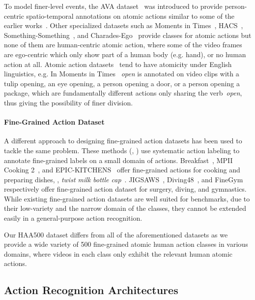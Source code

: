 \documentclass[10pt,twocolumn,letterpaper]{article}
\begin{document}
To model finer-level events, the AVA dataset~\cite{AVA} was introduced to provide person-centric spatio-temporal annotations on atomic actions similar to some of the earlier works~\cite{DBLP:conf/iccv/BlankGSIB05,DBLP:conf/icpr/SchuldtLC04}.
Other specialized datasets such as Moments in Times~\cite{momentsintime}, HACS~\cite{zhao2019hacs}, Something-Something~\cite{goyal2017something}, and Charades-Ego~\cite{sigurdsson2016hollywood} provide classes for atomic actions but none of them are human-centric atomic action, where some of the video frames are ego-centric which only show part of a human body (e.g. hand), or no human action at all. Atomic action datasets~\cite{AVA,momentsintime} tend to have atomicity under English linguistics, e.g. In Moments in Times~\cite{momentsintime} \textit{open} is annotated on video clips with a tulip opening, an eye opening, a person opening a door, or a person opening a package, which are fundamentally different actions only sharing the verb~\textit{open}, thus giving the possibility of finer division.


\paragraph{Fine-Grained Action Dataset} A different approach to designing fine-grained action datasets has been used to tackle the same problem. These methods (\eg, \cite{epickitchens,jigsaws,breakfast,diving48,MPIICooking2,finegym}) use systematic action labeling to annotate fine-grained labels on a small domain of actions. Breakfast~\cite{breakfast}, MPII Cooking 2~\cite{MPIICooking2}, and EPIC-KITCHENS~\cite{epickitchens} offer fine-grained actions for cooking and preparing dishes, \eg, \textit{twist milk bottle cap}~\cite{breakfast}.
JIGSAWS~\cite{jigsaws}, Diving48~\cite{diving48}, and FineGym~\cite{finegym} respectively offer fine-grained action dataset for surgery, diving, and gymnastics. While existing fine-grained action datasets are well suited for benchmarks, due to their low-variety and the narrow domain of the classes, they cannot be extended easily in a general-purpose action recognition.

Our HAA500 dataset differs from all of the aforementioned datasets as we provide a wide variety of 500 fine-grained atomic human action classes in various domains, where videos in each class only exhibit the relevant human atomic actions. 

\subsection{Action Recognition Architectures}
\end{document}
